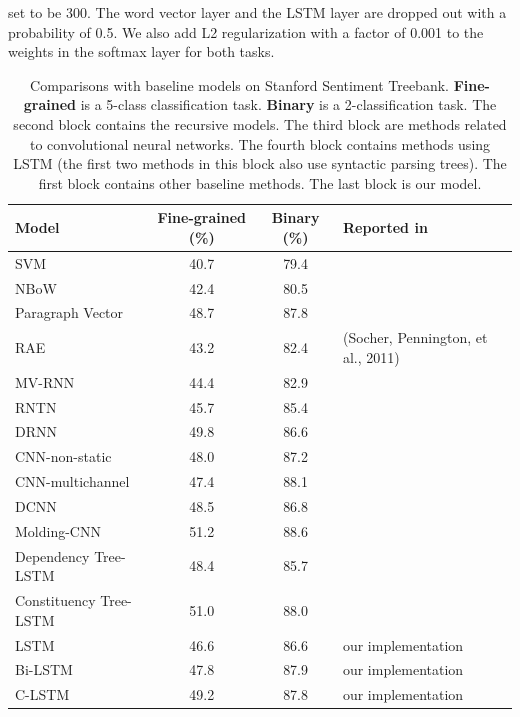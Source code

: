 \documentclass[11pt,letterpaper]{article}
\begin{document}
set to be 300. The word vector layer and the LSTM layer are dropped out with
a probability of 0.5. We also add L2 regularization with a factor of
0.001 to the weights in the softmax layer for both tasks.
\begin{table}[t]
\begin{center}
\begin{tabular}{l|c|c|l}
\hline
\bf Model & \bf Fine-grained (\%)  & \bf Binary (\%) & \bf Reported in\\
\hline
SVM       & 40.7             & 79.4                & \cite{socher2013}\\
NBoW      & 42.4             & 80.5                & \cite{dcnn}\\
Paragraph Vector  & 48.7     & 87.8                & \cite{pv}\\
\hline
RAE       & 43.2             & 82.4                & (Socher, Pennington, et al., 2011)\\
MV-RNN    & 44.4             & 82.9                & \cite{mvrnn}\\
RNTN      & 45.7             & 85.4                & \cite{socher2013}\\
DRNN              & 49.8     & 86.6                & \cite{drnn}\\
\hline
CNN-non-static    & 48.0     & 87.2                & \cite{kim}\\
CNN-multichannel  & 47.4     & 88.1                & \cite{kim}\\
DCNN     & 48.5              & 86.8                & \cite{dcnn}\\
Molding-CNN & 51.2           & 88.6                & \cite{tao}\\
\hline
Dependency Tree-LSTM & 48.4  & 85.7                & \cite{tai2015}\\
Constituency Tree-LSTM & 51.0& 88.0                & \cite{tai2015}\\
LSTM     & 46.6              & 86.6                & our implementation\\
Bi-LSTM  & 47.8              & 87.9                & our implementation\\
\hline
C-LSTM   & 49.2              & 87.8                & our implementation\\
\hline
\end{tabular}
\end{center}
\caption{\label{sst} Comparisons with baseline models on Stanford
Sentiment Treebank. {\bf Fine-grained} is a 5-class classification task.
{\bf Binary} is a 2-classification task. The second block contains
the recursive models. The third block are methods related to convolutional
neural networks. The fourth block contains methods using LSTM (the first
two methods in this block also use syntactic parsing trees). The first
block contains other baseline methods. The last block is our model.}
\end{table}
\end{document}
